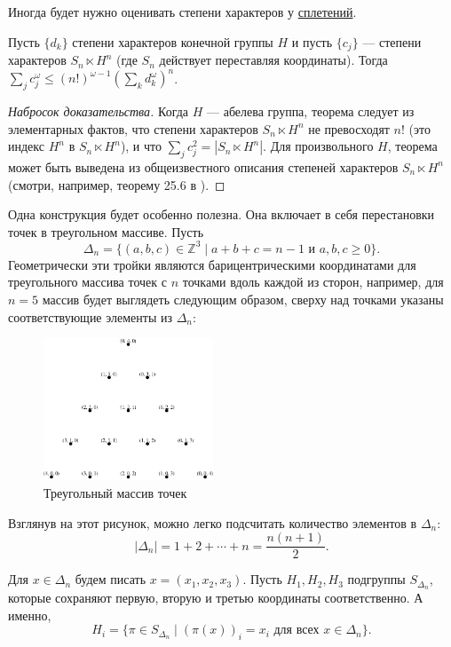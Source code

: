 Иногда будет нужно оценивать степени характеров у \hyperref[def:wreath_product]{сплетений}.

\begin{lemma}\label{lem:05:1.2}
  Пусть $\{ d_k\}$ степени характеров конечной группы $H$ и пусть $\{ c_j\}$ --- степени характеров $S_n \ltimes H^n$ (где $S_n$ действует переставляя координаты). Тогда $\sum_j c_j^\omega \leq (n!)^{\omega-1}\left( \sum_k d_k^\omega \right)^n$.
\end{lemma}
\begin{proof}[Набросок доказательства] 
Когда $H$ --- абелева группа, теорема следует из элементарных фактов, что степени характеров $S_n \ltimes H^n$ не превосходят $n!$ (это индекс $H^n$ в $S_n \ltimes H^n$), и что $\sum_j c_j^2 = |S_n \ltimes H^n|$. Для произвольного $H$, теорема может быть выведена из общеизвестного описания степеней характеров $S_n \ltimes H^n$ (смотри, например, теорему 25.6 в \cite{huppert1998}).
\end{proof}

Одна конструкция будет особенно полезна. Она включает в себя перестановки точек в треугольном массиве. Пусть
\[
	\Delta_n=\{ (a, b, c) \in \mathbb{Z}^3 \mid a+b+c=n-1 \mbox{ и } a,b,c \geq 0 \}.
\]
Геометрически эти тройки являются барицентрическими координатами для треугольного массива точек с $n$ точками вдоль каждой из сторон, например, для $n=5$ массив будет выглядеть следующим образом, сверху над точками указаны соответствующие элементы из $\Delta_n$:
\begin{figure}[H]
	\centering
    \includegraphics[width=0.45\textwidth]{figures/triangle_array_with_labels}
	\caption{Треугольный массив точек}
	\label{fig:triangle_array_with_labels}
\end{figure}
Взглянув на этот рисунок, можно легко подсчитать количество элементов в $\Delta_n$:
\[
	|\Delta_n| = 1 + 2 + \dotsb + n = \frac{n (n + 1)}{2}.
\]

Для $x \in \Delta_n$ будем писать $x = (x_1,x_2,x_3)$. Пусть $H_1, H_2, H_3$ подгруппы $S_{\Delta_n}$, которые сохраняют первую, вторую и третью координаты соответственно. А именно,
\[
	H_i = \{ \pi \in  S_{\Delta_n} \mid (\pi(x))_i = x_i \mbox{ для всех } x \in \Delta_n\}.
\]


